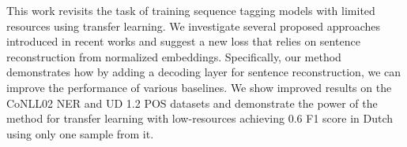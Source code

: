 This work revisits the task of training sequence tagging models with limited resources using transfer learning. We investigate several proposed approaches introduced in recent works and suggest a new loss that relies on sentence reconstruction from normalized embeddings. Specifically, our method demonstrates how by adding a decoding layer for sentence reconstruction, we can improve the performance of various baselines. We show improved results on the CoNLL02 NER and UD 1.2 POS datasets and demonstrate the power of the method for transfer learning with low-resources achieving 0.6 F1 score in Dutch using only one sample from it.
